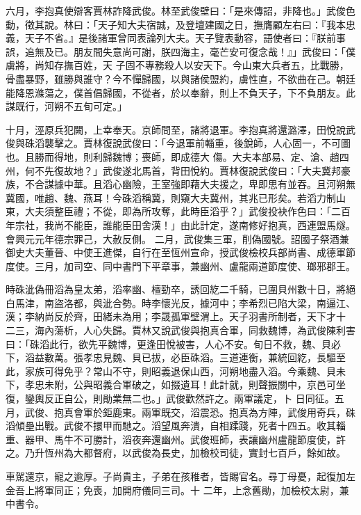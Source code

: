 \begin{pinyinscope}
 六月，李抱真使辯客賈林詐降武俊。林至武俊壁曰：「是來傳詔，非降也。」武俊色動，徵其說。林曰：「天子知大夫宿誠，及登壇建國之日，撫膺顧左右曰：『我本忠義，天子不省。』是後諸軍曾同表論列大夫。天子覽表動容，語使者曰：『朕前事誤，追無及已。朋友間失意尚可謝，朕四海主，毫芒安可復念哉！』」武俊曰：「僕虜將，尚知存撫百姓，天
 子固不專務殺人以安天下。今山東大兵者五，比戰勝，骨盡暴野，雖勝與誰守？今不憚歸國，以與諸侯盟約，虜性直，不欲曲在己。朝廷能降恩滌蕩之，僕首倡歸國，不從者，於以奉辭，則上不負天子，下不負朋友。此謀既行，河朔不五旬可定。」



 十月，涇原兵犯闕，上幸奉天。京師問至，諸將退軍。李抱真將還潞澤，田悅說武俊與硃滔襲擊之。賈林復說武俊曰：「今退軍前輜重，後銳師，人心固一，不可圖也。且勝而得地，則利歸魏博；喪師，即成德大
 傷。大夫本部易、定、滄、趙四州，何不先復故地？」武俊遂北馬首，背田悅約。賈林復說武俊曰：「大夫冀邦豪族，不合謀據中華。且滔心幽險，王室強即藉大夫援之，卑即思有並吞。且河朔無冀國，唯趙、魏、燕耳！今硃滔稱冀，則窺大夫冀州，其兆已形矣。若滔力制山東，大夫須整臣禮；不從，即為所攻奪，此時臣滔乎？」武俊投袂作色曰：「二百年宗社，我尚不能臣，誰能臣田舍漢！」由此計定，遂南修好抱真，西連盟馬燧。會興元元年德宗罪己，大赦反側。
 二月，武俊集三軍，削偽國號。詔國子祭酒兼御史大夫董晉、中使王進傑，自行在至恆州宣命，授武俊檢校兵部尚書、成德軍節度使。三月，加司空、同中書門下平章事，兼幽州、盧龍兩道節度使、瑯邪郡王。



 時硃泚偽冊滔為皇太弟，滔率幽、檀勁卒，誘回紇二千騎，已圍貝州數十日，將絕白馬津，南盜洛都，與泚合勢。時李懷光反，據河中；李希烈已陷大梁，南逼江、漢；李納尚反於齊，田緒未為用；李晟孤軍壁渭上。天子羽書所制者，天下才十
 二三，海內蕩析，人心失歸。賈林又說武俊與抱真合軍，同救魏博，為武俊陳利害曰：「硃滔此行，欲先平魏博，更逢田悅被害，人心不安。旬日不救，魏、貝必下，滔益數萬。張孝忠見魏、貝已拔，必臣硃滔。三道連衡，兼統回紇，長驅至此，家族可得免乎？常山不守，則昭義退保山西，河朔地盡入滔。今乘魏、貝未下，孝忠未附，公與昭義合軍破之，如掇遺耳！此計就，則聲振關中，京邑可坐復，鑾輿反正自公，則勛業無二也。」武俊歡然許之。兩軍議定，卜
 日同征。五月，武俊、抱真會軍於鉅鹿東。兩軍既交，滔震恐。抱真為方陣，武俊用奇兵，硃滔傾壘出戰。武俊不擐甲而馳之。滔望風奔潰，自相蹂踐，死者十四五。收其輜重、器甲、馬牛不可勝計，滔夜奔還幽州。武俊班師，表讓幽州盧龍節度使，許之。乃升恆州為大都督府，以武俊為長史，加檢校司徒，實封七百戶，餘如故。



 車駕還京，寵之逾厚。子尚貴主，子弟在孩稚者，皆賜官名。尋丁母憂，起復加左金吾上將軍同正；免喪，加開府儀同三司。十
 二年，上念舊勛，加檢校太尉，兼中書令。




\end{pinyinscope}
